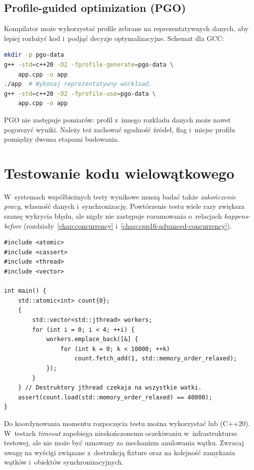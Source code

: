 \subsection{Profile-guided optimization (PGO)}

Kompilator może wykorzystać profile zebrane na reprezentatywnych
danych, aby lepiej rozłożyć kod i~podjąć decyzje optymalizacyjne.
Schemat dla GCC:

\begin{lstlisting}[language=bash,caption={Dwa przebiegi budowania z PGO (GCC).}]
mkdir -p pgo-data
g++ -std=c++20 -O2 -fprofile-generate=pgo-data \
    app.cpp -o app
./app  # Wykonaj reprezentatywny workload.
g++ -std=c++20 -O2 -fprofile-use=pgo-data \
    app.cpp -o app
\end{lstlisting}

PGO nie zastępuje pomiarów: profil z~innego rozkładu danych może
nawet pogorszyć wyniki. Należy też zachować zgodność źródeł, flag
i~miejsc profilu pomiędzy dwoma etapami budowania.

\section{Testowanie kodu wielowątkowego}
\label{sec:cpp18-concurrency-tests}

W~systemach współbieżnych testy wynikowe muszą badać także
\emph{zakończenie pracy}, własność danych i~synchronizację.
Powtórzenie testu wiele razy zwiększa szansę wykrycia błędu, ale
nigdy nie zastępuje rozumowania o~relacjach \emph{happens-before}
(rozdziały~\ref{chap:concurrency} i~\ref{chap:cpp16-advanced-concurrency}).

\begin{lstlisting}[caption={Poprawny test licznika atomowego z jthread (C++20).}]
#include <atomic>
#include <cassert>
#include <thread>
#include <vector>

int main() {
    std::atomic<int> count{0};
    {
        std::vector<std::jthread> workers;
        for (int i = 0; i < 4; ++i) {
            workers.emplace_back([&] {
                for (int k = 0; k < 10000; ++k)
                    count.fetch_add(1, std::memory_order_relaxed);
            });
        }
    } // Destruktory jthread czekaja na wszystkie watki.
    assert(count.load(std::memory_order_relaxed) == 40000);
}
\end{lstlisting}

Do koordynowania momentu rozpoczęcia testu można wykorzystać
 lub  (C++20). W~testach
\emph{timeout} zapobiega nieskończonemu oczekiwaniu w~infrastrukturze
testowej, ale nie może być uznawany za mechanizm anulowania
wątku. Zwracaj uwagę na wyścigi związane z~destrukcją fixture
oraz na kolejność zamykania wątków i~obiektów synchronizacyjnych.

